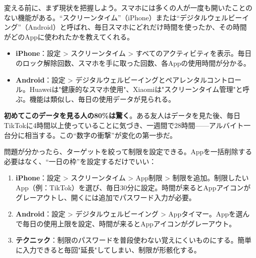 


変える前に、まず現状を把握しよう。スマホには多くの人が一度も開いたことのない機能がある。“スクリーンタイム”（iPhone）または“デジタルウェルビーイング”（Android）と呼ばれ、毎日スマホにどれだけ時間を使ったか、その時間がどのAppに使われたかを教えてくれる。

\begin{itemize}
  \item \textbf{iPhone}：設定 > スクリーンタイム > すべてのアクティビティを表示。毎日のロック解除回数、スマホを手に取った回数、各Appの使用時間が分かる。
  \item \textbf{Android}：設定 > デジタルウェルビーイングとペアレンタルコントロール。Huaweiは"健康的なスマホ使用"、Xiaomiは"スクリーンタイム管理"と呼ぶ。機能は類似し、毎日の使用データが見られる。
\end{itemize}

\textbf{初めてこのデータを見る人の80\%は驚く}。ある友人はデータを見た後、毎日TikTokに4時間以上使っていることに気づき、一週間で28時間——アルバイト一台分に相当する。この“数字の衝撃”が変化の第一歩だ。


問題が分かったら、ターゲットを絞って制限を設定できる。Appを一括削除する必要はなく、“一日の枠”を設定するだけでいい：

\begin{enumerate}
  \item \textbf{iPhone}：設定 > スクリーンタイム > App制限 > 制限を追加。制限したいApp（例：TikTok）を選び、毎日30分に設定。時間が来るとAppアイコンがグレーアウトし、開くには追加でパスワード入力が必要。
  \item \textbf{Android}：設定 > デジタルウェルビーイング > Appタイマー。Appを選んで毎日の使用上限を設定、時間が来るとAppアイコンがグレーアウト。
  \item \textbf{テクニック}：制限のパスワードを普段使わない覚えにくいものにする。簡単に入力できると毎回"延長"してしまい、制限が形骸化する。
\end{enumerate}

